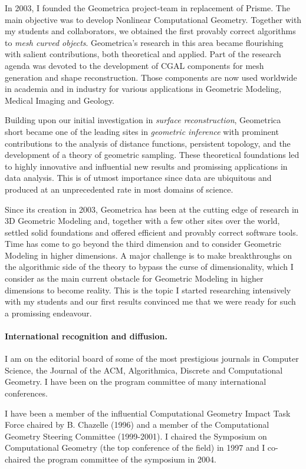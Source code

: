 In 2003, I founded the Geometrica project-team in replacement of Prisme. The main objective was to develop Nonlinear Computational Geometry. Together with my students and collaborators, we obtained the first provably correct algorithms to {\em mesh curved objects}. Geometrica's research in this area became flourishing with salient contributions, both theoretical and applied. Part of the research agenda was devoted to the development of CGAL components for mesh generation and  shape reconstruction. Those components are now used worldwide in academia and in industry for  various applications in Geometric Modeling, Medical Imaging and Geology.

Building upon our initial investigation in {\em surface reconstruction}, Geometrica short became one of the leading sites in {\em geometric inference} with prominent contributions to the analysis of distance functions, persistent topology, and the development of a theory of geometric sampling. These theoretical foundations led to highly innovative and influential new results and promissing applications in data analysis. This is of utmost importance since data are ubiquitous and produced at an unprecedented rate in most domains of science. 

Since its creation in 2003, Geometrica has been at the cutting edge of research in 3D Geometric Modeling and, together with a few other sites over the world, settled solid foundations and offered efficient and provably correct software tools.  Time has come to go beyond the third dimension and to consider Geometric Modeling in higher dimensions. A major challenge is to make breakthroughs on the algorithmic side of the theory to bypass the curse of dimensionality, which I consider as the main current obstacle for Geometric Modeling in higher dimensions to become reality. This is the topic I started researching intensively with my students and our first results convinced me that we were ready for such a promissing endeavour. 

\paragraph{International recognition and diffusion.}

I am on the editorial board of some of the most prestigious  journals in Computer Science, the Journal of the ACM, Algorithmica, Discrete and Computational Geometry. I have been on the program committee of many international conferences.

I have been a member of the influential Computational Geometry Impact Task Force chaired by B. Chazelle (1996) and a member of the Computational Geometry Steering Committee (1999-2001). I chaired the Symposium on Computational Geometry (the top conference of the field) in 1997 and I co-chaired the program committee of the symposium in 2004.

